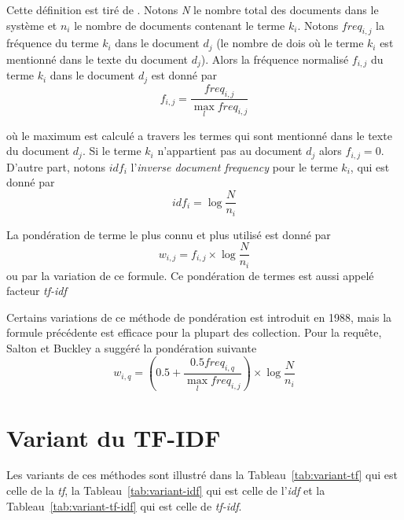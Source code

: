 \begin{definition}
    Cette définition est tiré de  . Notons \emph{N} le nombre total des documents dans le système et $n_{i}$ le nombre de documents contenant le terme $k_{i}$. Notons $freq_{i,j}$ la fréquence du terme $k_{i}$ dans le document $d_{j}$ (le nombre de dois où le terme $k_{i}$ est mentionné dans le texte du document $d_{j}$). Alors la fréquence normalisé $f_{i,j}$ du terme $k_{i}$ dans le document $d_{j}$ est donné par
    \[
        f_{i,j} = \frac{freq_{i,j}}{\max_{l} freq_{i,j}}
    \]

    où le maximum est calculé a travers les termes qui sont mentionné dans le texte du document $d_{j}$. Si le terme $k_{i}$ n'appartient pas au document $d_{j}$ alors $f_{i,j} = 0$. D'autre part, notons $idf_{i}$ l'\emph{inverse document frequency} pour le terme $k_{i}$, qui est donné par
    \[
        idf_{i} = \log{\frac{N}{n_{i}}}
    \]

    La pondération de terme le plus connu et plus utilisé est donné par
    \[
        w_{i,j} = f_{i,j} \times \log{\frac{N}{n_{i}}}
    \]
    ou par la variation de ce formule. Ce pondération de termes est aussi appelé facteur \emph{tf-idf}
\end{definition}

Certains variations de ce méthode de pondération est introduit en 1988, mais la formule précédente est efficace pour la plupart des collection. Pour la requête, Salton et Buckley  a suggéré la pondération suivante
\[
    w_{i,q} = \left(0.5 + \frac{0.5 freq_{i,q}}{\max_{l} freq_{i,j}}\right) \times \log{\frac{N}{n_{i}}}
\]

\section{Variant du TF-IDF}
Les variants de ces méthodes sont illustré dans la Tableau~\ref{tab:variant-tf} qui est celle de la \emph{tf}, la Tableau~\ref{tab:variant-idf} qui est celle de l'\emph{idf} et la Tableau~\ref{tab:variant-tf-idf} qui est celle de \emph{tf-idf}.

